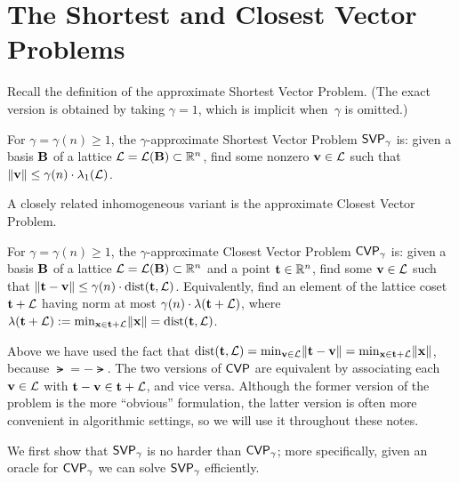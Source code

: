 \documentclass[11pt]{article}
\begin{document}
\thispagestyle{fancy} %


\section{The Shortest and Closest Vector Problems}
\label{sec:svp-cvp}

Recall the definition of the approximate Shortest Vector Problem. (The
exact version is obtained by taking $\gamma=1$, which is implicit
when~$\gamma$ is omitted.)

\begin{definition}
  \label{def:svp}
  For $\gamma = \gamma(n) \geq 1$, the $\gamma$-approximate Shortest
  Vector Problem $\mathsf{SVP}_{\gamma}$ is: given a basis $\mathbf{B}$ of a
  lattice $\mathcal{L} = \mathcal{L}(\mathbf{B}) \subset \mathbb{R}^{n}$, find some nonzero
  $\mathbf{v} \in \mathcal{L}$ such that
  $\lVert\mathbf{v}\rVert \leq \gamma(n) \cdot \lambda_{1}(\mathcal{L})$.
\end{definition}

\noindent A closely related inhomogeneous variant is the approximate
Closest Vector Problem.

\begin{definition}
  \label{def:cvp}
  For $\gamma = \gamma(n) \geq 1$, the $\gamma$-approximate Closest
  Vector Problem $\mathsf{CVP}_{\gamma}$ is: given a basis $\mathbf{B}$ of a
  lattice $\mathcal{L} = \mathcal{L}(\mathbf{B}) \subset \mathbb{R}^{n}$ and a point
  $\mathbf{t} \in \mathbb{R}^{n}$, find some $\mathbf{v} \in \mathcal{L}$ such that
  $\lVert\mathbf{t} - \mathbf{v}\rVert \leq \gamma(n) \cdot \operatorname{dist}(\mathbf{t},\mathcal{L})$.
  Equivalently, find an element of the lattice coset $\mathbf{t} + \mathcal{L}$
  having norm at most $\gamma(n) \cdot \lambda(\mathbf{t}+\mathcal{L})$, where
  $\lambda(\mathbf{t}+\mathcal{L}) := \min_{\mathbf{x} \in \mathbf{t}+\mathcal{L}} \lVert\mathbf{x}\rVert =
  \operatorname{dist}(\mathbf{t},\mathcal{L})$.
\end{definition}

Above we have used the fact that
$\operatorname{dist}(\mathbf{t}, \mathcal{L}) = \min_{\mathbf{v} \in \mathcal{L}} \lVert\mathbf{t} - \mathbf{v}\rVert =
\min_{\mathbf{x} \in \mathbf{t}+\mathcal{L}} \lVert\mathbf{x}\rVert$, because $\lat = -\lat$.
The two versions of $\mathsf{CVP}$ are equivalent by associating each
$\mathbf{v} \in \mathcal{L}$ with $\mathbf{t} - \mathbf{v} \in \mathbf{t} + \mathcal{L}$, and vice
versa. Although the former version of the problem is the more
``obvious'' formulation, the latter version is often more convenient
in algorithmic settings, so we will use it throughout these notes.

We first show that $\mathsf{SVP}_{\gamma}$ is no harder than $\mathsf{CVP}_{\gamma}$;
more specifically, given an oracle for $\mathsf{CVP}_{\gamma}$ we can solve
$\mathsf{SVP}_{\gamma}$ efficiently.
\end{document}
